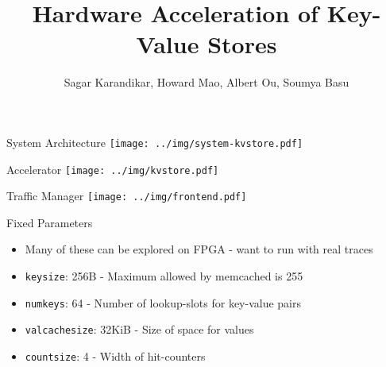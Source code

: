 \documentclass{beamer}
\title{Hardware Acceleration of Key-Value Stores}
\author{Sagar Karandikar, Howard Mao, Albert Ou, Soumya Basu}
\institute[UC Berkeley]{\textsc{University of California, Berkeley}}
\begin{document}
\frame{\titlepage}

\begin{frame}
    
\end{frame}

\begin{frame}{System Architecture}
    \texttt{[image: ../img/system-kvstore.pdf]}
\end{frame}

\begin{frame}{Accelerator}
    \texttt{[image: ../img/kvstore.pdf]}
\end{frame}

\begin{frame}{Traffic Manager}
    \texttt{[image: ../img/frontend.pdf]}
\end{frame}


\begin{frame}
    
\end{frame}

\begin{frame}{Fixed Parameters}
    \begin{itemize}
        \item Many of these can be explored on FPGA - want to run with real traces
        \item \texttt{keysize}: 256B - Maximum allowed by memcached is 255
        \item \texttt{numkeys}: 64 - Number of lookup-slots for key-value pairs
        \item \texttt{valcachesize}: 32KiB - Size of space for values
        \item \texttt{countsize}: 4 - Width of hit-counters
    \end{itemize}
\end{frame}
\end{document}
